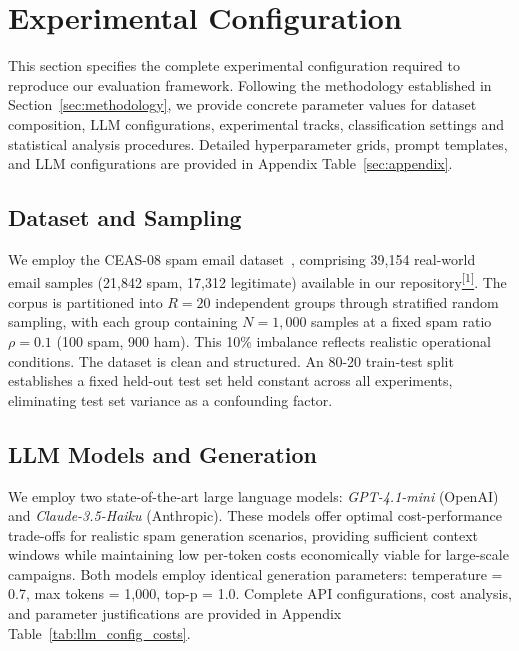 \section{Experimental Configuration}
\label{sec:experiment}

This section specifies the complete experimental configuration required to reproduce our evaluation framework. Following the methodology established in Section~\ref{sec:methodology}, we provide concrete parameter values for dataset composition, LLM configurations, experimental tracks, classification settings and statistical analysis procedures. Detailed hyperparameter grids, prompt templates, and LLM configurations are provided in Appendix Table~\ref{sec:appendix}.

\subsection{Dataset and Sampling}
We employ the CEAS-08 spam email dataset~\cite{champa2024curated}, comprising 39,154 real-world email samples (21,842 spam, 17,312 legitimate) available in our repository\href{https://github.com/tisage/llm-synthetic-spam-benchmark}{\textsuperscript{[1]}}. The corpus is partitioned into $R = 20$ independent groups through stratified random sampling, with each group containing $N = 1{,}000$ samples at a fixed spam ratio $\rho = 0.1$ (100 spam, 900 ham). This 10\% imbalance reflects realistic operational conditions. The dataset is clean and structured. An 80-20 train-test split establishes a fixed held-out test set held constant across all experiments, eliminating test set variance as a confounding factor.

\subsection{LLM Models and Generation}
We employ two state-of-the-art large language models: \textit{GPT-4.1-mini} (OpenAI) and \textit{Claude-3.5-Haiku} (Anthropic). These models offer optimal cost-performance trade-offs for realistic spam generation scenarios, providing sufficient context windows while maintaining low per-token costs economically viable for large-scale campaigns. Both models employ identical generation parameters: temperature = 0.7, max tokens = 1,000, top-p = 1.0. Complete API configurations, cost analysis, and parameter justifications are provided in Appendix Table~\ref{tab:llm_config_costs}.

